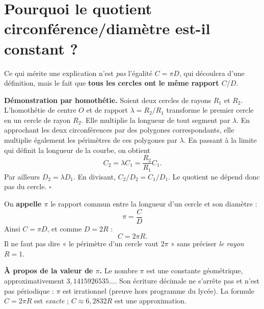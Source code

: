 \documentclass[../cours_spe_trigo.tex]{subfiles}
\begin{document}
\section{Pourquoi le quotient circonférence/diamètre est-il constant ?}
Ce qui mérite une explication n'est \emph{pas} l'égalité $C=\pi D$, qui découlera d'une définition, mais le fait que \textbf{tous les cercles ont le même rapport $C/D$}.
\begin{demonstration}
\textbf{Démonstration par homothétie.} Soient deux cercles de rayons $R_1$ et $R_2$. L'homothétie de centre $O$ et de rapport $\lambda=R_2/R_1$ transforme le premier cercle en un cercle de rayon $R_2$. Elle multiplie la longueur de tout segment par $\lambda$. En approchant les deux circonférences par des polygones correspondants, elle multiplie également les périmètres de ces polygones par $\lambda$. En passant à la limite qui définit la longueur de la courbe, on obtient
\[
C_2=\lambda C_1=\frac{R_2}{R_1}C_1.
\]
Par ailleurs $D_2=\lambda D_1$. En divisant, $C_2/D_2=C_1/D_1$. Le quotient ne dépend donc pas du cercle. $\square$
\end{demonstration}
\begin{definition}
On \textbf{appelle $\pi$} le rapport commun entre la longueur d'un cercle et son diamètre :
\[\boxed{\displaystyle\pi=\frac{C}{D}}\]
Ainsi $C=\pi D$, et comme $D=2R$ :
\[\boxed{\displaystyle C=2\pi R.}\]
Il ne faut pas dire « le périmètre d'un cercle vaut $2\pi$ » sans préciser \emph{le rayon $R=1$}.
\end{definition}
\textbf{À propos de la valeur de $\pi$.} Le nombre $\pi$ est une constante géométrique, approximativement $3{,}1415926535\ldots$. Son écriture décimale ne s'arrête pas et n'est pas périodique : $\pi$ est irrationnel (preuve hors programme du lycée). La formule $C=2\pi R$ est \emph{exacte} ; $C\approx 6{,}2832R$ est une approximation.
\end{document}
